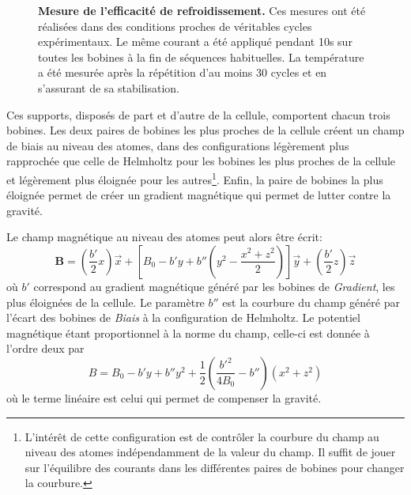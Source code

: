 \begin{figure}
\centering

\caption{\textbf{Mesure de l'efficacité de refroidissement.} Ces mesures ont été réalisées dans des conditions proches de véritables cycles expérimentaux. Le même courant a été appliqué pendant 10s sur toutes les bobines à la fin de séquences habituelles. La température a été mesurée après la répétition d'au moins 30 cycles et en s'assurant de sa stabilisation.}
\label{fig:refroidissement_levitation}
\end{figure}


Ces supports, disposés de part et d'autre de la cellule, comportent chacun trois bobines. Les deux paires de bobines les plus proches de la cellule créent un champ de biais au niveau des atomes, dans des configurations légèrement plus rapprochée que celle de Helmholtz pour les bobines les plus proches de la cellule et légèrement plus éloignée pour les autres\footnote{L'intérêt de cette configuration est de contrôler la courbure du champ au niveau des atomes indépendamment de la valeur du champ. Il suffit de jouer sur l'équilibre des courants dans les différentes paires de bobines pour changer la courbure.}. Enfin, la paire de bobines la plus éloignée permet de créer un gradient magnétique qui permet de lutter contre la gravité.

Le champ magnétique au niveau des atomes peut alors être écrit:
\begin{equation}
\mathbf{B}=\left( \frac{b'}{2}x \right) \vec{x} + \left[ B_0 - b'y + b'' \left( y^2 - \frac{x^2+z^2}{2} \right) \right] \vec{y} + \left( \frac{b'}{2}z \right) \vec{z}
\end{equation}
où $b'$ correspond au gradient magnétique généré par les bobines de \emph{Gradient}, les plus éloignées de la cellule. Le  paramètre $b''$ est la courbure du champ généré par l'écart des bobines de \emph{Biais} à la configuration de Helmholtz. 
Le potentiel magnétique étant proportionnel à la norme du champ, celle-ci est donnée à l'ordre deux par
\begin{equation}
B=B_0 -b' y + b'' y^2 +\frac{1}{2} \left( \frac{b'^2}{4 B_0} - b'' \right) \left( x^2 + z^2 \right) 
\label{eq:norme_levitation}
\end{equation}
où le terme linéaire est celui qui permet de compenser la gravité.



